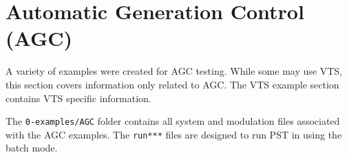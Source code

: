 \pagebreak
\section{Automatic Generation Control (AGC)} 
A variety of examples were created for AGC testing.
While some may use VTS, this section covers information only related to AGC.
The VTS example section contains VTS specific information.

The \verb|0-examples/AGC| folder contains all system and modulation files associated with the AGC examples.
The \verb|run***| files are designed to run PST in using the batch mode.